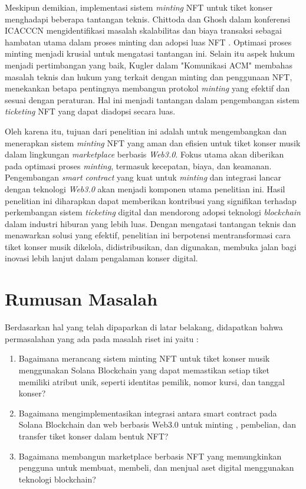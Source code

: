 Meskipun demikian, implementasi sistem \textit{minting} NFT untuk tiket konser menghadapi beberapa tantangan teknis. Chittoda dan Ghosh dalam konferensi ICACCCN mengidentifikasi masalah skalabilitas dan biaya transaksi sebagai hambatan utama dalam proses minting dan adopsi luas NFT \cite{ref6}. Optimasi proses minting menjadi krusial untuk mengatasi tantangan ini. Selain itu aspek hukum menjadi pertimbangan yang baik, Kugler dalam "Komunikasi ACM" membahas masalah teknis dan hukum yang terkait dengan minting dan penggunaan NFT, menekankan betapa pentingnya membangun protokol \textit{minting} yang efektif dan sesuai dengan peraturan\cite{ref7}. Hal ini menjadi tantangan dalam pengembangan sistem \textit{ticketing} NFT yang dapat diadopsi secara luas. 

Oleh karena itu, tujuan dari penelitian ini adalah untuk mengembangkan dan menerapkan sistem \textit{minting} NFT yang aman dan efisien untuk tiket konser musik dalam lingkungan \textit{marketplace} berbasis \textit{Web3.0}. Fokus utama akan diberikan pada optimasi proses \textit{minting}, termasuk kecepatan, biaya, dan keamanan. Pengembangan \textit{smart contract} yang kuat untuk \textit{minting} dan integrasi lancar dengan teknologi \textit{Web3.0} akan menjadi komponen utama penelitian ini. Hasil penelitian ini diharapkan dapat memberikan kontribusi yang signifikan terhadap perkembangan sistem \textit{ticketing} digital dan mendorong adopsi teknologi \textit{blockchain} dalam industri hiburan yang lebih luas. Dengan mengatasi tantangan teknis dan menawarkan solusi yang efektif, penelitian ini berpotensi mentransformasi cara tiket konser musik dikelola, didistribusikan, dan digunakan, membuka jalan bagi inovasi lebih lanjut dalam pengalaman konser digital.

\section{Rumusan Masalah}

Berdasarkan hal yang telah dipaparkan di latar belakang, didapatkan bahwa permasalahan yang ada pada masalah riset ini yaitu :
\begin{enumerate}
    \item Bagaimana merancang sistem minting NFT untuk tiket konser musik menggunakan Solana Blockchain yang dapat memastikan setiap tiket memiliki atribut unik, seperti identitas pemilik, nomor kursi, dan tanggal konser?
    \item Bagaimana mengimplementasikan integrasi antara smart contract pada Solana Blockchain dan web berbasis Web3.0 untuk  minting , pembelian, dan transfer tiket konser dalam bentuk NFT?
    \item Bagaimana membangun marketplace berbasis NFT yang memungkinkan pengguna untuk membuat, membeli, dan menjual aset digital menggunakan teknologi blockchain?
\end{enumerate}



